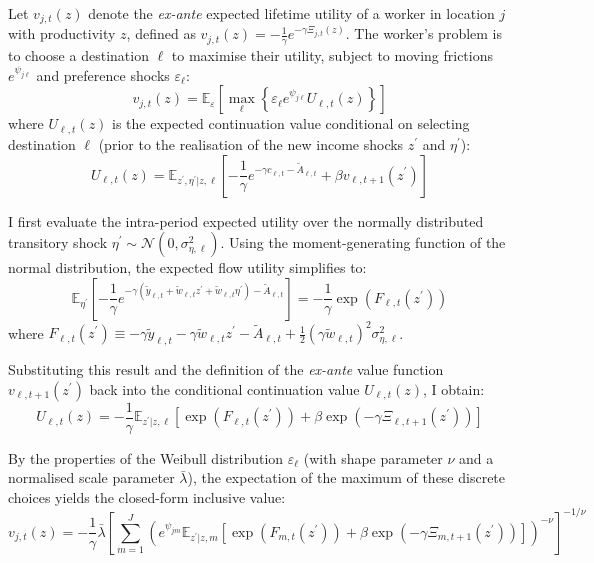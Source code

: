\documentclass[12pt, a4paper]{article}
\begin{document}
Let $v_{j,t}(z)$ denote the \textit{ex-ante} expected lifetime utility of a worker in location $j$ with productivity $z$, defined as $v_{j,t}(z) = -\frac{1}{\gamma} e^{-\gamma \Xi_{j,t}(z)}$. The worker's problem is to choose a destination $\ell$ to maximise their utility, subject to moving frictions $e^{\psi_{j\ell}}$ and preference shocks $\varepsilon_\ell$:
\begin{equation}
v_{j,t}(z) = \mathbb{E}_{\varepsilon} \left[ \max_{\ell} \left\{ \varepsilon_\ell e^{\psi_{j\ell}} U_{\ell,t}(z) \right\} \right]
\end{equation}
where $U_{\ell,t}(z)$ is the expected continuation value conditional on selecting destination $\ell$ (prior to the realisation of the new income shocks $z^\prime$ and $\eta^\prime$):
\begin{equation}
U_{\ell,t}(z) = \mathbb{E}_{z^\prime, \eta^\prime | z, \ell} \left[ -\frac{1}{\gamma} e^{-\gamma c_{\ell,t} - \tilde{A}_{\ell,t}} + \beta v_{\ell,t+1}(z^\prime) \right]
\end{equation}

I first evaluate the intra-period expected utility over the normally distributed transitory shock $\eta^\prime \sim \mathcal{N}(0, \sigma_{\eta, \ell}^2)$. Using the moment-generating function of the normal distribution, the expected flow utility simplifies to:
\begin{equation}
\mathbb{E}_{\eta^\prime} \left[ -\frac{1}{\gamma} e^{-\gamma (\tilde{y}_{\ell,t} + \tilde{w}_{\ell,t}z^\prime + \tilde{w}_{\ell,t}\eta^\prime) - \tilde{A}_{\ell,t}} \right] = -\frac{1}{\gamma} \exp\left(F_{\ell,t}(z^\prime)\right)
\end{equation}
where $F_{\ell,t}(z^\prime) \equiv -\gamma \tilde{y}_{\ell,t} - \gamma \tilde{w}_{\ell,t} z^\prime - \tilde{A}_{\ell,t} + \frac{1}{2}(\gamma \tilde{w}_{\ell,t})^2 \sigma_{\eta,\ell}^2$.

Substituting this result and the definition of the \textit{ex-ante} value function $v_{\ell,t+1}(z^\prime)$ back into the conditional continuation value $U_{\ell,t}(z)$, I obtain:
\begin{equation}
U_{\ell,t}(z) = -\frac{1}{\gamma} \mathbb{E}_{z^\prime | z, \ell} \left[ \exp\left(F_{\ell,t}(z^\prime)\right) + \beta \exp\left(-\gamma \Xi_{\ell,t+1}(z^\prime)\right) \right]
\end{equation}

By the properties of the Weibull distribution $\varepsilon_\ell$ (with shape parameter $\nu$ and a normalised scale parameter $\bar{\lambda}$), the expectation of the maximum of these discrete choices yields the closed-form inclusive value:
\begin{equation}
v_{j,t}(z) = -\frac{1}{\gamma} \bar{\lambda} \left[ \sum_{m=1}^J \left( e^{\psi_{jm}} \mathbb{E}_{z^\prime | z, m} \left[ \exp\left(F_{m,t}(z^\prime)\right) + \beta \exp\left(-\gamma \Xi_{m,t+1}(z^\prime)\right) \right] \right)^{-\nu} \right]^{-1/\nu}
\end{equation}
\end{document}
